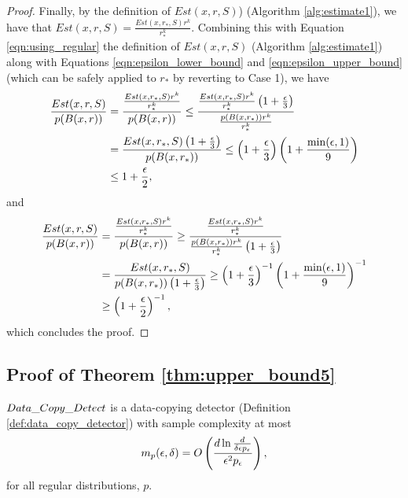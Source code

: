 \begin{proof}
Finally, by the definition of $Est(x, r, S)$) (Algorithm \ref{alg:estimate1}), we have that $Est(x, r, S) = \frac{Est(x, r_*, S)r^k}{r_*^k}$. Combining this with Equation \ref{eqn:using_regular} the definition of $Est(x,r, S)$ (Algorithm \ref{alg:estimate1}) along with Equations \ref{eqn:epsilon_lower_bound} and \ref{eqn:epsilon_upper_bound} (which can be safely applied to $r_*$ by reverting to Case 1), we have
\begin{equation*}
\begin{split}
\frac{Est(x, r, S)}{p(B(x, r))} &= \frac{\frac{Est(x, r_*, S)r^k}{r_*^k}}{p(B(x, r))} \leq \frac{\frac{Est(x, r_*, S)r^k}{r_*^k}\left(1 + \frac{\epsilon}{3}\right)}{\frac{p(B(x, r_*))r^k}{r_*^k}} \\
&= \frac{Est(x, r_*, S)\left(1 + \frac{\epsilon}{3}\right)}{p(B(x, r_*))} \leq \left(1 + \frac{\epsilon}{3}\right)\left(1 + \frac{\min(\epsilon, 1)}{9}\right) \\
&\leq 1 + \frac{\epsilon}{2},
\end{split}
\end{equation*}
and
\begin{equation*}
\begin{split}
\frac{Est(x, r, S)}{p(B(x, r))} &= \frac{\frac{Est(x, r_*, S)r^k}{r_*^k}}{p(B(x, r))} \geq \frac{\frac{Est(x, r_*, S)r^k}{r_*^k}}{\frac{p(B(x, r_*))r^k}{r_*^k}\left(1 + \frac{\epsilon}{3}\right)} \\
&= \frac{Est(x, r_*, S)}{p(B(x, r_*))\left(1 + \frac{\epsilon}{3}\right)} \geq \left(1 + \frac{\epsilon}{3}\right)^{-1}\left(1 + \frac{\min(\epsilon, 1)}{9}\right)^{-1} \\
&\geq \left(1 + \frac{\epsilon}{2}\right)^{-1},
\end{split}
\end{equation*}
which concludes the proof.


\end{proof}

\subsection{Proof of Theorem \ref{thm:upper_bound5}}\label{sec:upper_bound_proof}

\begin{theorem}
$Data\_Copy\_Detect{}$ is a data-copying detector (Definition \ref{def:data_copy_detector}) with sample complexity at most $$m_p(\epsilon, \delta) = O\left(\frac{d\ln\frac{d}{\delta\epsilon p_\epsilon}}{\epsilon^2 p_\epsilon}\right),$$ for all regular distributions, $p$. 
\end{theorem}

